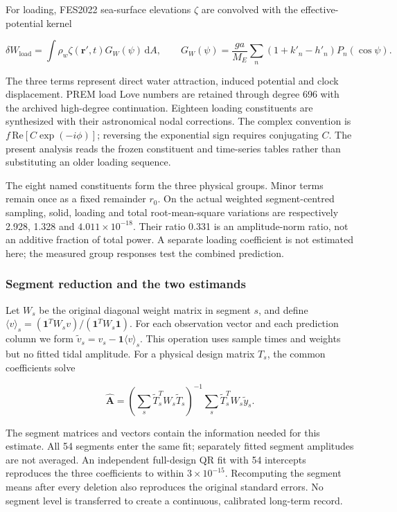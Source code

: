 \documentclass[
  12pt,
  a4paper,
]{article}
\begin{document}
For loading, FES2022 sea-surface elevations \(\zeta\) are convolved with
the effective-potential kernel

\[\delta W_{\mathrm{load}}=\int \rho_w\zeta(\mathbf{r}',t)G_W(\psi)\,\mathrm{d}A,\qquad
G_W(\psi)=\frac{ga}{M_E}\sum_n(1+k'_n-h'_n)P_n(\cos\psi).\]

The three terms represent direct water attraction, induced potential and
clock displacement. PREM load Love numbers are retained through degree
696 with the archived high-degree continuation. Eighteen loading
constituents are synthesized with their astronomical nodal corrections.
The complex convention is \(f\,\mathrm{Re}[C\exp(-i\phi)]\); reversing
the exponential sign requires conjugating \(C\). The present analysis
reads the frozen constituent and time-series tables rather than
substituting an older loading sequence.

The eight named constituents form the three physical groups. Minor terms
remain once as a fixed remainder \(r_0\). On the actual weighted
segment-centred sampling, solid, loading and total root-mean-square
variations are respectively 2.928, 1.328 and \(4.011\times10^{-18}\).
Their ratio 0.331 is an amplitude-norm ratio, not an additive fraction
of total power. A separate loading coefficient is not estimated here;
the measured group responses test the combined prediction.

\hypertarget{segment-reduction-and-the-two-estimands}{%
\subsubsection{Segment reduction and the two
estimands}\label{segment-reduction-and-the-two-estimands}}

Let \(W_s\) be the original diagonal weight matrix in segment \(s\), and
define
\(\langle v\rangle_s=(\mathbf{1}^TW_sv)/(\mathbf{1}^TW_s\mathbf{1})\).
For each observation vector and each prediction column we form
\(\widetilde v_s=v_s-\mathbf{1}\langle v\rangle_s\). This operation uses
sample times and weights but no fitted tidal amplitude. For a physical
design matrix \(T_s\), the common coefficients solve

\[\widehat{\boldsymbol A}=\left(\sum_s\widetilde T_s^TW_s\widetilde T_s\right)^{-1}\sum_s\widetilde T_s^TW_s\widetilde y_s.\]

The segment matrices and vectors contain the information needed for this
estimate. All 54 segments enter the same fit; separately fitted segment
amplitudes are not averaged. An independent full-design QR fit with 54
intercepts reproduces the three coefficients to within
\(3\times10^{-15}\). Recomputing the segment means after every deletion
also reproduces the original standard errors. No segment level is
transferred to create a continuous, calibrated long-term record.
\end{document}
